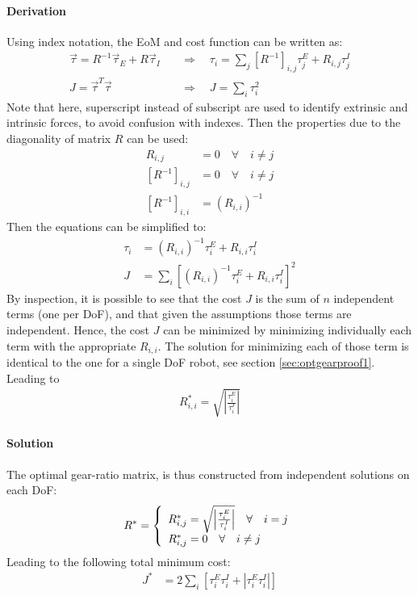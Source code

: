 \paragraph{Derivation}

Using index notation, the EoM and cost function can be written as:
%
\begin{align}
\vec{ \tau } =  R^{-1} \vec{\tau}_E + R \vec{\tau}_I \quad &\Rightarrow \quad \tau_i = \sum_j{ \left[ R^{-1}\right]_{i,j} \tau_j^E + R_{i,j} \tau_j^I }\\
J =  \vec{ \tau }^T \vec{ \tau } \quad &\Rightarrow \quad J = \sum_i{ \tau_i^2 }
\end{align}
%
Note that here, superscript instead of subscript are used to identify extrinsic and intrinsic forces, to avoid confusion with indexes. Then the properties due to the diagonality of matrix $R$ can be used:
%
\begin{align}
R_{i,j}                    &= 0 \quad \forall \quad i \neq j \\
\left[ R^{-1}\right]_{i,j} &= 0 \quad \forall \quad i \neq j \\
\left[ R^{-1}\right]_{i,i} &= \left( R_{i,i}  \right)^{-1}
\end{align}
%
Then the equations can be simplified to:
%
\begin{align}
\tau_i &= \left( R_{i,i}  \right)^{-1} \tau_i^E + R_{i,i} \tau_i^I \\
J      &= \sum_i{ \left[  \left( R_{i,i}  \right)^{-1} \tau_i^E + R_{i,i} \tau_i^I   \right]^2 }
\end{align}
%
By inspection, it is possible to see that the cost $J$ is the sum of $n$ independent terms (one per DoF), and that given the assumptions those terms are independent. Hence, the cost $J$ can be minimized by minimizing individually each term with the appropriate $R_{i,i}$. The solution for minimizing each of those term is identical to the one for a single DoF robot, see section \ref{sec:optgearproof1}. Leading to 
%
\begin{align}
R_{i,i}^* = \sqrt{\left| \frac{\tau_i^E}{\tau_i^I}\right|}
\end{align}
%

\paragraph{Solution}
The optimal gear-ratio matrix, is thus constructed from independent solutions on each DoF:
%
\begin{align}
R^* = \left \{
\begin{array}[pos]{l}
	R^*_{i,j} = \sqrt{\left| \frac{\tau_i^E}{\tau_i^I}\right|} \quad \forall \quad i = j \\
	R^*_{i,j} = 0                                              \quad \forall \quad i \neq j
\end{array} \right.
\end{align}
%
Leading to the following total minimum cost:
%
\begin{align}
J^*   &= 2 \sum_i{ \left[ \tau_i^E \tau_i^I + \left| \tau_i^E \tau_i^I \right| \right] }
\end{align}
%

